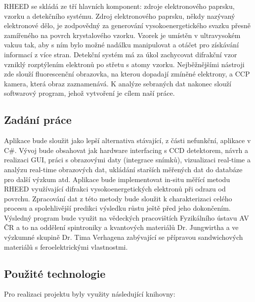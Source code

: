 \documentclass{article}
\begin{document}
    RHEED se skládá ze tří hlavních komponent: zdroje elektronového paprsku, vzorku a detekčního systému. Zdroj elektronového paprsku, někdy nazývaný elektronové dělo, je zodpovědný za generování vysokoenergetického svazku přesně zamířeného na povrch krystalového vzorku. Vzorek je umístěn v ultravysokém vakuu tak, aby s ním bylo možné nadálku manipulovat a otáčet pro získávání informací z více stran. Detekční systém má za úkol zachycovat difrakční vzor vzniklý rozptýlením elektronů po střetu s atomy vzorku. Nejběžnějšími nástroji zde slouží fluorescenční obrazovka, na kterou dopadají zmíněné elektrony, a CCP kamera, která obraz zaznamenává. K analýze sebraných dat nakonec slouží softwarový program, jehož vytvoření je cílem naší práce.
    
\subsection{Zadání práce}
    Aplikace bude sloužit jako lepší alternativa stávající, z části nefunkční, aplikace v C\#. Vývoj bude obsahovat jak hardware interfacing s CCD detektorem, návrh a realizaci GUI, práci s obrazovými daty (integrace snímků), vizualizaci real-time a analýzu real-time obrazových dat, ukládání starších měřených dat do databáze pro další výzkum atd. Aplikace bude implementovat in-situ měřící metodu RHEED využívající difrakci vysokoenergetických elektronů při odrazu od povrchu. Zpracování dat z této metody bude sloužit k charakterizaci celého procesu a spolehlivější predikci výsledku růstu ještě před jeho dokončením. Výsledný program bude využit na vědeckých pracovištích Fyzikálního ústavu AV ČR a to na oddělení spintroniky a kvantových materiálů Dr. Jungwirtha a ve výzkumné skupině Dr. Tima Verhagena zabývající se přípravou sandwichových materiálů s feroelektrickými vlastnostmi.
\newpage
\subsection{Použité technologie}

Pro realizaci projektu byly využity následující knihovny:
\end{document}

